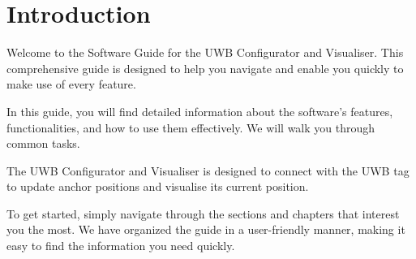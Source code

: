\chapter{Introduction}

Welcome to the Software Guide for the UWB Configurator and Visualiser. This comprehensive guide is designed to help you navigate and enable you quickly to make use of every feature. 

In this guide, you will find detailed information about the software's features, functionalities, and how to use them effectively. We will walk you through common tasks. 

The UWB Configurator and Visualiser is designed to connect with the UWB tag to update anchor positions and visualise its current position. 

To get started, simply navigate through the sections and chapters that interest you the most. We have organized the guide in a user-friendly manner, making it easy to find the information you need quickly.
